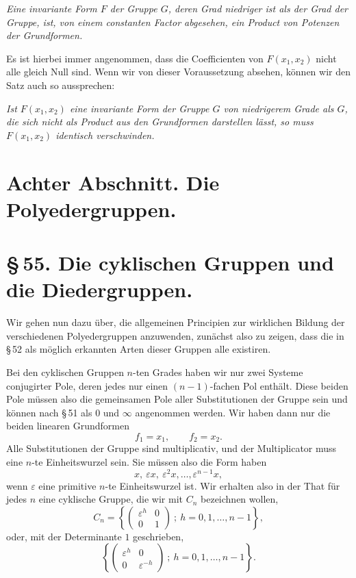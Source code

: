 \documentclass[11pt]{article}
\providecommand{\eps}{\varepsilon}
\providecommand{\eps}{\varepsilon}
\providecommand{\mat}[4]{\begin{pmatrix}#1&#2\\#3&#4\end{pmatrix}}
\providecommand{\mat}[4]{\begin{pmatrix}#1&#2\\#3&#4\end{pmatrix}}
\providecommand{\mat}[1]{\begin{pmatrix}#1\end{pmatrix}}
\begin{document}
\emph{Eine invariante Form $F$ der Gruppe $G$, deren Grad niedriger ist als der Grad der Gruppe, ist, von einem constanten Factor abgesehen, ein Product von Potenzen der Grundformen.}

Es ist hierbei immer angenommen, dass die Coefficienten von $F(x_1,x_2)$ nicht alle gleich Null sind. Wenn wir von dieser Voraussetzung absehen, können wir den Satz auch so aussprechen:

\emph{Ist $F(x_1,x_2)$ eine invariante Form der Gruppe $G$ von niedrigerem Grade als $G$, die sich nicht als Product aus den Grundformen darstellen lässt, so muss $F(x_1,x_2)$ identisch verschwinden.}

\clearpage

\clearpage
\section*{Achter Abschnitt. Die Polyedergruppen.}

\section*{\S\,55. Die cyklischen Gruppen und die Diedergruppen.}

Wir gehen nun dazu über, die allgemeinen Principien zur wirklichen Bildung der verschiedenen Polyedergruppen anzuwenden, zunächst also zu zeigen, dass die in \S\,52 als möglich erkannten Arten dieser Gruppen alle existiren.

Bei den cyklischen Gruppen $n$-ten Grades haben wir nur zwei Systeme conjugirter Pole, deren jedes nur einen $(n-1)$-fachen Pol enthält. Diese beiden Pole müssen also die gemeinsamen Pole aller Substitutionen der Gruppe sein und können nach \S\,51 als $0$ und $\infty$ angenommen werden. Wir haben dann nur die beiden linearen Grundformen
\begin{equation}
 f_1=x_1,\qquad f_2=x_2 .
\tag{1}
\end{equation}
Alle Substitutionen der Gruppe sind multiplicativ, und der Multiplicator muss eine $n$-te Einheitswurzel sein. Sie müssen also die Form haben
\begin{equation}
 x,\ \eps x,\ \eps^2x,\ldots,\eps^{n-1}x,
\tag{2}
\end{equation}
wenn $\eps$ eine primitive $n$-te Einheitswurzel ist. Wir erhalten also in der That für jedes $n$ eine cyklische Gruppe, die wir mit $C_n$ bezeichnen wollen,
\begin{equation}
 C_n=\left\{\mat{\eps^h}{0}{0}{1}\ ;\ h=0,1,\ldots,n-1\right\},
\tag{3}
\end{equation}
oder, mit der Determinante $1$ geschrieben,
\[
 \left\{\mat{\eps^h}{0}{0}{\eps^{-h}}\ ;\ h=0,1,\ldots,n-1\right\}.
\]
\end{document}
